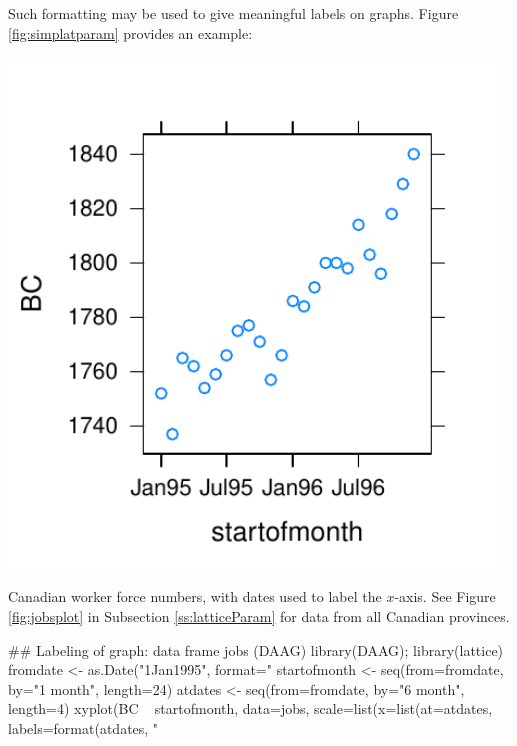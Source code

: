 \documentclass{tufte-book}\usepackage[]{graphicx}\usepackage[]{color}
\begin{document}
Such formatting may be used to give meaningful labels on graphs.
Figure \ref{fig:simplatparam} provides an example:
\begin{marginfigure}[2cm]
\begin{Schunk}


\centerline{\includegraphics[width=0.97\textwidth]{figs/06-date-labs-1} }

\end{Schunk}
 \caption{Canadian worker force numbers, with dates used to label the
   $x$-axis. See Figure \ref{fig:jobsplot} in
   Subsection \ref{ss:latticeParam} for data from all Canadian
 provinces.}\label{fig:simplatparam}
\end{marginfigure}
\begin{Schunk}
\begin{Sinput}
## Labeling of graph: data frame jobs (DAAG)
library(DAAG); library(lattice)
fromdate <- as.Date("1Jan1995", format="%
startofmonth <- seq(from=fromdate, by="1 month",
                    length=24)
atdates <- seq(from=fromdate, by="6 month",
               length=4)
xyplot(BC ~ startofmonth, data=jobs,
       scale=list(x=list(at=atdates,
                         labels=format(atdates,
                                       "%
\end{Sinput}
\end{Schunk}
\end{document}
